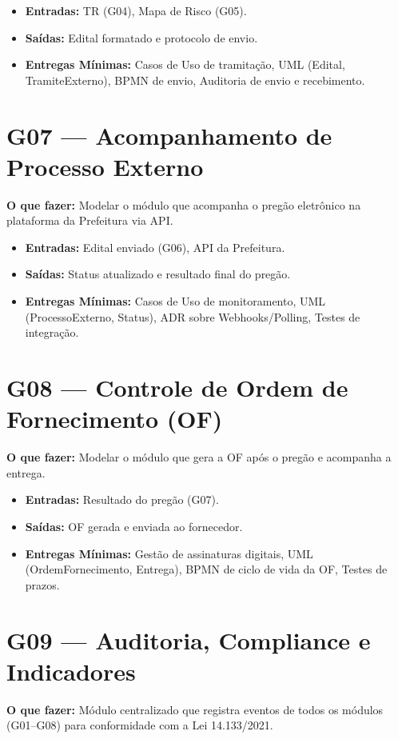 \documentclass[a4paper,12pt]{article}
\begin{document}
\begin{itemize}[leftmargin=*]
    \item \textbf{Entradas:} TR (G04), Mapa de Risco (G05).
    \item \textbf{Saídas:} Edital formatado e protocolo de envio.
    \item \textbf{Entregas Mínimas:} Casos de Uso de tramitação, UML (Edital, TramiteExterno), BPMN de envio, Auditoria de envio e recebimento.
\end{itemize}

\section*{G07 --- Acompanhamento de Processo Externo}
\textbf{O que fazer:} Modelar o módulo que acompanha o pregão eletrônico na plataforma da Prefeitura via API.

\begin{itemize}[leftmargin=*]
    \item \textbf{Entradas:} Edital enviado (G06), API da Prefeitura.
    \item \textbf{Saídas:} Status atualizado e resultado final do pregão.
    \item \textbf{Entregas Mínimas:} Casos de Uso de monitoramento, UML (ProcessoExterno, Status), ADR sobre Webhooks/Polling, Testes de integração.
\end{itemize}

\section*{G08 --- Controle de Ordem de Fornecimento (OF)}
\textbf{O que fazer:} Modelar o módulo que gera a OF após o pregão e acompanha a entrega.

\begin{itemize}[leftmargin=*]
    \item \textbf{Entradas:} Resultado do pregão (G07).
    \item \textbf{Saídas:} OF gerada e enviada ao fornecedor.
    \item \textbf{Entregas Mínimas:} Gestão de assinaturas digitais, UML (OrdemFornecimento, Entrega), BPMN de ciclo de vida da OF, Testes de prazos.
\end{itemize}

\section*{G09 --- Auditoria, Compliance e Indicadores}
\textbf{O que fazer:} Módulo centralizado que registra eventos de todos os módulos (G01--G08) para conformidade com a Lei 14.133/2021.
\end{document}
